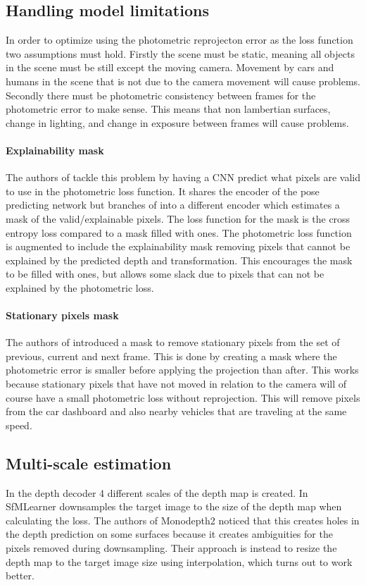 \subsection{Handling model limitations}
\label{sec:modellimit}

In order to optimize using the photometric reprojecton error as the loss function two assumptions must hold. Firstly the scene must be static, meaning all objects in the scene must be still except the moving camera. Movement by cars and humans in the scene that is not due to the camera movement will cause problems. Secondly there must be photometric consistency between frames for the photometric error to make sense. This means that non lambertian surfaces, change in lighting, and change in exposure between frames will cause problems.

\paragraph{Explainability mask} The authors of \cite{sfmlearner} tackle this problem by having a CNN predict what pixels are valid to use in the photometric loss function. It shares the encoder of the pose predicting network but branches of into a different encoder which estimates a mask of the valid/explainable pixels. The loss function for the mask is the cross entropy loss compared to a mask filled with ones. The photometric loss function is augmented to include the explainability mask removing pixels that cannot be explained by the predicted depth and transformation. This encourages the mask to be filled with ones, but allows some slack due to pixels that can not be explained by the photometric loss.

\paragraph{Stationary pixels mask} The authors of \cite{monodepth2} introduced a mask to remove stationary pixels from the set of previous, current and next frame. This is done by creating a mask where the photometric error is smaller before applying the projection than after. This works because stationary pixels that have not moved in relation to the camera will of course have a small photometric loss without reprojection. This will remove pixels from the car dashboard and also nearby vehicles that are traveling at the same speed.

\subsection{Multi-scale estimation}

In the depth decoder 4 different scales of the depth map is created. In SfMLearner downsamples the target image to the size of the depth map when calculating the loss. The authors of Monodepth2 noticed that this creates holes in the depth prediction on some surfaces because it creates ambiguities for the pixels removed during downsampling. Their approach is instead to resize the depth map to the target image size using interpolation, which turns out to work better.

\fi